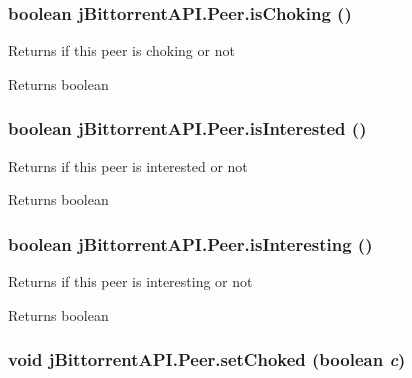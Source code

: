 \hypertarget{classj_bittorrent_a_p_i_1_1_peer_a14f019b3986a9b45c8f9464118ff994d}{
\subsubsection[{isChoking}]{\setlength{\rightskip}{0pt plus 5cm}boolean jBittorrentAPI.Peer.isChoking ()}}
\label{classj_bittorrent_a_p_i_1_1_peer_a14f019b3986a9b45c8f9464118ff994d}
Returns if this peer is choking or not \begin{DoxyReturn}{Returns}
boolean 
\end{DoxyReturn}
\hypertarget{classj_bittorrent_a_p_i_1_1_peer_af294901b95599c05a7b11697e1881252}{
\subsubsection[{isInterested}]{\setlength{\rightskip}{0pt plus 5cm}boolean jBittorrentAPI.Peer.isInterested ()}}
\label{classj_bittorrent_a_p_i_1_1_peer_af294901b95599c05a7b11697e1881252}
Returns if this peer is interested or not \begin{DoxyReturn}{Returns}
boolean 
\end{DoxyReturn}
\hypertarget{classj_bittorrent_a_p_i_1_1_peer_a1f8c763eaf3f5b037a90fd71cb2db123}{
\subsubsection[{isInteresting}]{\setlength{\rightskip}{0pt plus 5cm}boolean jBittorrentAPI.Peer.isInteresting ()}}
\label{classj_bittorrent_a_p_i_1_1_peer_a1f8c763eaf3f5b037a90fd71cb2db123}
Returns if this peer is interesting or not \begin{DoxyReturn}{Returns}
boolean 
\end{DoxyReturn}
\hypertarget{classj_bittorrent_a_p_i_1_1_peer_abaafe98ab9364cd5f97bf44845ffe547}{
\subsubsection[{setChoked}]{\setlength{\rightskip}{0pt plus 5cm}void jBittorrentAPI.Peer.setChoked (boolean {\em c})}}
